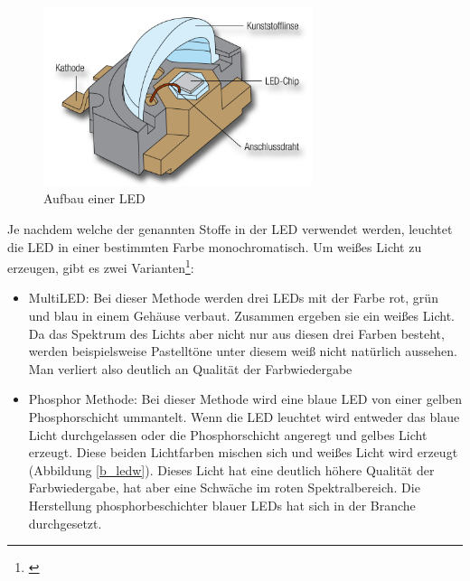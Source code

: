\begin{figure}[htp]     %
\centering
\includegraphics[width=0.7\textwidth]{bilder/led} 
\caption {Aufbau einer LED\protect\footnotemark}\label{b_led}
\end{figure}


\noindent Je nachdem welche der genannten Stoffe in der LED verwendet werden, leuchtet die LED in einer bestimmten Farbe monochromatisch. Um weißes Licht zu erzeugen, gibt es zwei Varianten\footnote{\cite[151-152]{mueller}}:

\begin{itemize}
\item MultiLED: Bei dieser Methode werden drei LEDs mit der Farbe rot, grün und blau in einem Gehäuse verbaut. Zusammen ergeben sie ein weißes Licht. Da das Spektrum des Lichts aber nicht nur aus diesen drei Farben besteht, werden beispielsweise Pastelltöne unter diesem weiß nicht natürlich aussehen. Man verliert also deutlich an Qualität der Farbwiedergabe

\item Phosphor Methode: Bei dieser Methode wird eine blaue LED von einer gelben Phosphorschicht ummantelt. Wenn die LED leuchtet wird entweder das blaue Licht durchgelassen oder die Phosphorschicht angeregt und gelbes Licht erzeugt. Diese beiden Lichtfarben mischen sich und weißes Licht wird erzeugt (Abbildung \ref{b_ledw}). Dieses Licht hat eine deutlich höhere Qualität der Farbwiedergabe, hat aber eine Schwäche im roten Spektralbereich. Die Herstellung phosphorbeschichter blauer LEDs hat sich in der Branche durchgesetzt.
\end{itemize}

